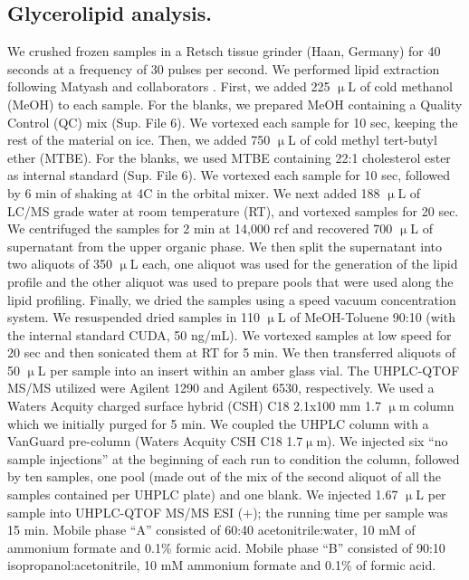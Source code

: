 \documentclass[9pt,twocolumn,twoside,lineno]{biorxiv}
\begin{document}
\subsection{Glycerolipid analysis.} 
We crushed frozen samples in a Retsch tissue grinder (Haan, Germany) for 40 seconds at a frequency of 30 pulses per second. 
We performed lipid extraction following Matyash and collaborators \cite{Matyash2008-ue}. 
First, we added 225 $\upmu$L of cold methanol (MeOH) to each sample. 
For the blanks, we prepared MeOH containing a Quality Control (QC) mix (Sup. File 6).
We vortexed each sample for 10 sec, keeping the rest of the material on ice. 
Then, we added 750 $\upmu$L of cold methyl tert-butyl ether (MTBE). 
For the blanks, we used MTBE containing 22:1 cholesterol ester as internal standard (Sup. File 6). 
We vortexed each sample for 10 sec, followed by 6 min of shaking at 4\degree C in the orbital mixer. 
We next added 188 $\upmu$L of LC/MS grade water at room temperature (RT), and vortexed samples for 20 sec.
We centrifuged the samples for 2 min at 14,000 rcf and recovered 700 $\upmu$L of supernatant from the upper organic phase. 
We then split the supernatant into two aliquots of 350 $\upmu$L each, one aliquot was used for the generation of the lipid profile and the other aliquot was used to prepare pools that were used along the lipid profiling. 
Finally, we dried the samples using a speed vacuum concentration system.
We resuspended dried samples in 110 $\upmu$L of MeOH-Toluene 90:10 (with the internal standard CUDA, 50 ng/mL). 
We vortexed samples at low speed for 20 sec and then sonicated them at RT for 5 min. 
We then transferred aliquots of 50 $\upmu$L per sample into an insert within an amber glass vial.
The UHPLC-QTOF MS/MS utilized were Agilent 1290 and Agilent 6530, respectively. 
We used a Waters Acquity charged surface hybrid (CSH) C18 2.1x100 mm 1.7 $\upmu$m column which we initially purged for 5 min. 
We coupled the UHPLC column with a VanGuard pre-column (Waters Acquity CSH C18 1.7$\upmu$m). 
We injected six “no sample injections” at the beginning of each run to condition the column, followed by ten samples, one pool (made out of the mix of the second aliquot of all the samples contained per UHPLC plate) and one blank.
We injected 1.67 $\upmu$L per sample into UHPLC-QTOF MS/MS ESI (+); the running time per sample was 15 min. 
Mobile phase “A” consisted of 60:40 acetonitrile:water, 10 mM of ammonium formate and 0.1\% formic acid. 
Mobile phase “B” consisted of 90:10 isopropanol:acetonitrile, 10 mM ammonium formate and 0.1\% of formic acid. 
\end{document}
